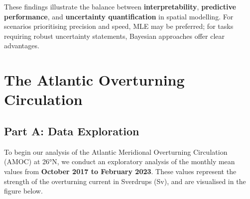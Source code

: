\documentclass[
  11pt,
]{article}
\begin{document}
These findings illustrate the balance between \textbf{interpretability},
\textbf{predictive performance}, and \textbf{uncertainty quantification}
in spatial modelling. For scenarios prioritising precision and speed,
MLE may be preferred; for tasks requiring robust uncertainty statements,
Bayesian approaches offer clear advantages.

\newpage

\section{The Atlantic Overturning
Circulation}\label{the-atlantic-overturning-circulation}

\subsection{Part A: Data Exploration}\label{part-a-data-exploration}

To begin our analysis of the Atlantic Meridional Overturning Circulation
(AMOC) at 26°N, we conduct an exploratory analysis of the monthly mean
values from \textbf{October 2017 to February 2023}. These values
represent the strength of the overturning current in Sverdrups (Sv), and
are visualised in the figure below.
\end{document}
